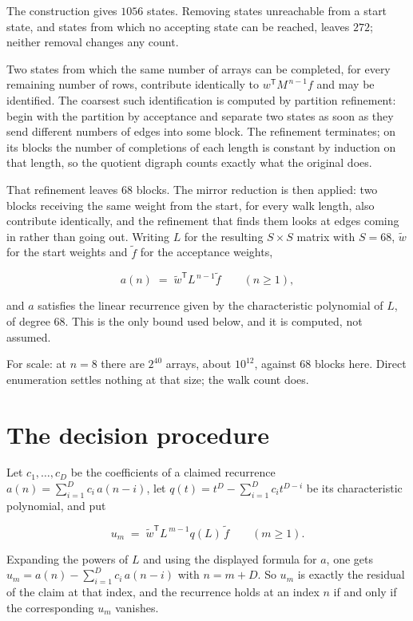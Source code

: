 \documentclass[11pt]{article}
\theoremstyle{definition}
\begin{document}
The construction gives $1056$ states. Removing states unreachable from a start state, and states from which no accepting state can be reached, leaves $272$; neither removal changes any count.

Two states from which the same number of arrays can be completed, for every remaining number of rows, contribute identically to $w^{\mathsf T}M^{\,n-1}f$ and may be identified. The coarsest such identification is computed by partition refinement: begin with the partition by acceptance and separate two states as soon as they send different numbers of edges into some block. The refinement terminates; on its blocks the number of completions of each length is constant by induction on that length, so the quotient digraph counts exactly what the original does.

That refinement leaves $68$ blocks. The mirror reduction is then applied: two blocks receiving the same weight from the start, for every walk length, also contribute identically, and the refinement that finds them looks at edges coming in rather than going out. Writing $L$ for the resulting $S \times S$ matrix with $S = 68$, $\tilde w$ for the start weights and $\tilde f$ for the acceptance weights,

\[a(n) \;=\; \tilde w^{\mathsf T} L^{\,n-1} \tilde f \qquad (n \ge 1),\]

and $a$ satisfies the linear recurrence given by the characteristic polynomial of $L$, of degree $68$. This is the only bound used below, and it is computed, not assumed.

For scale: at $n = 8$ there are $2^{40}$ arrays, about $10^{12}$, against $68$ blocks here. Direct enumeration settles nothing at that size; the walk count does.

\section{The decision procedure}

Let $c_1,\dots,c_D$ be the coefficients of a claimed recurrence $a(n) = \sum_{i=1}^{D} c_i\,a(n-i)$, let $q(t) = t^{D} - \sum_{i=1}^{D} c_i t^{D-i}$ be its characteristic polynomial, and put

\[u_m \;=\; \tilde w^{\mathsf T} L^{\,m-1} q(L)\,\tilde f \qquad (m \ge 1).\]

Expanding the powers of $L$ and using the displayed formula for $a$, one gets $u_m = a(n) - \sum_{i=1}^{D} c_i\,a(n-i)$ with $n = m + D$. So $u_m$ is exactly the residual of the claim at that index, and the recurrence holds at an index $n$ if and only if the corresponding $u_m$ vanishes.
\end{document}
